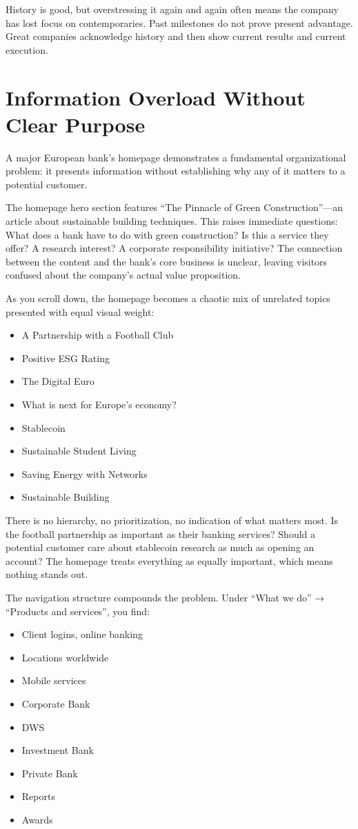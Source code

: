 History is good, but overstressing it again and again often means the company has lost focus on contemporaries. Past milestones do not prove present advantage. Great companies acknowledge history and then show current results and current execution.

\section{Information Overload Without Clear Purpose}

A major European bank's homepage demonstrates a fundamental organizational problem: it presents information without establishing why any of it matters to a potential customer.

The homepage hero section features ``The Pinnacle of Green Construction''—an article about sustainable building techniques. This raises immediate questions: What does a bank have to do with green construction? Is this a service they offer? A research interest? A corporate responsibility initiative? The connection between the content and the bank's core business is unclear, leaving visitors confused about the company's actual value proposition.

As you scroll down, the homepage becomes a chaotic mix of unrelated topics presented with equal visual weight:
\begin{itemize}
    \item A Partnership with a Football Club
    \item Positive ESG Rating
    \item The Digital Euro
    \item What is next for Europe's economy?
    \item Stablecoin
    \item Sustainable Student Living
    \item Saving Energy with Networks
    \item Sustainable Building
\end{itemize}

There is no hierarchy, no prioritization, no indication of what matters most. Is the football partnership as important as their banking services? Should a potential customer care about stablecoin research as much as opening an account? The homepage treats everything as equally important, which means nothing stands out.

The navigation structure compounds the problem. Under ``What we do'' → ``Products and services'', you find:
\begin{itemize}
    \item Client logins, online banking
    \item Locations worldwide
    \item Mobile services
    \item Corporate Bank
    \item DWS
    \item Investment Bank
    \item Private Bank
    \item Reports
    \item Awards
\end{itemize}

